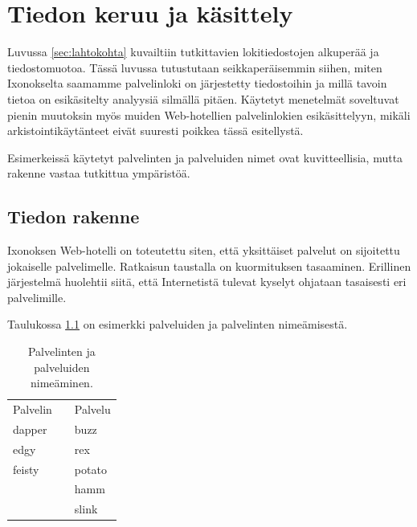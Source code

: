 
\chapter{Tiedon keruu ja käsittely}

Luvussa \ref{sec:lahtokohta} kuvailtiin tutkittavien lokitiedostojen
alkuperää ja tiedostomuotoa. Tässä luvussa tutustutaan
seikkaperäisemmin siihen, miten Ixonokselta saamamme palvelinloki on
järjestetty tiedostoihin ja millä tavoin tietoa on esikäsitelty
analyysiä silmällä pitäen. Käytetyt menetelmät soveltuvat pienin
muutoksin myös muiden Web-hotellien palvelinlokien esikäsittelyyn,
mikäli arkistointikäytänteet eivät suuresti poikkea tässä esitellystä.

Esimerkeissä käytetyt palvelinten ja palveluiden nimet ovat
kuvitteellisia, mutta rakenne vastaa tutkittua ympäristöä.


\section{Tiedon rakenne}

Ixonoksen Web-hotelli on toteutettu siten, että yksittäiset palvelut on
sijoitettu jokaiselle palvelimelle. Ratkaisun taustalla on
kuormituksen tasaaminen. Erillinen järjestelmä huolehtii siitä, että
Internetistä tulevat kyselyt ohjataan tasaisesti eri
palvelimille. 

Taulukossa \ref{nimet} on esimerkki palveluiden ja
palvelinten nimeämisestä.

\begin{table}[h]
\centering
\begin{tabular}{lll}
Palvelin && Palvelu \\
\cline{1-1}\cline{3-3}
dapper && buzz \\
edgy && rex \\
feisty && potato \\
&& hamm \\
&& slink \\
\end{tabular}
\caption{Palvelinten ja palveluiden nimeäminen.}
\label{nimet}
\end{table}

